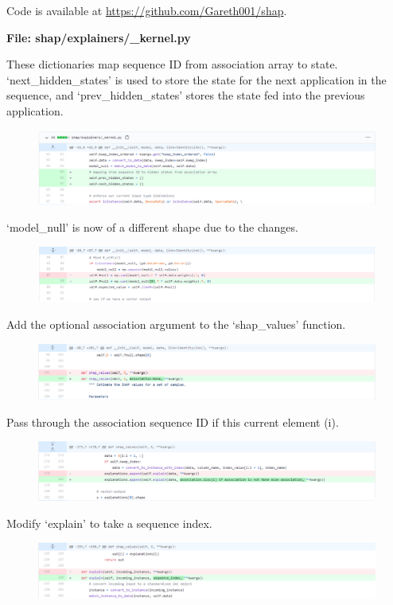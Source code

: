 \documentclass[12pt]{article}
\begin{document}
Code is available at \url{https://github.com/Gareth001/shap}. 

\textbf{File: shap/explainers/\_kernel.py}

These dictionaries map sequence ID from association array to state. `next\_hidden\_states' is used to store the state for the next application in the sequence, and `prev\_hidden\_states' stores the state fed into the previous application.
\begin{figure}[H]
\includegraphics[scale=0.45]{diff/diff_1.png}
\end{figure}
`model\_null' is now of a different shape due to the changes. 
\begin{figure}[H]
\includegraphics[scale=0.45]{diff/diff_2.png}
\end{figure}
Add the optional association argument to the `shap\_values' function.
\begin{figure}[H]
\includegraphics[scale=0.45]{diff/diff_3.png}
\end{figure}
Pass through the association sequence ID if this current element (i).
\begin{figure}[H]
\includegraphics[scale=0.45]{diff/diff_4.png}
\end{figure}
Modify `explain' to take a sequence index.
\begin{figure}[H]
\includegraphics[scale=0.45]{diff/diff_5.png}
\end{figure}
\end{document}
